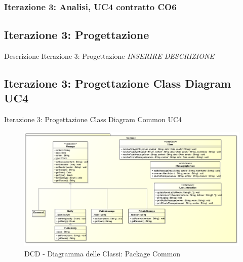 \begin{frame}
 \frametitle{Iterazione 3: Analisi, UC4 contratto CO6 }
  \begin{table}[!htbp]
   \caption {UC3 Contratto CO6 - privateMsg}
    \label{table_CO6}
   \end{table}
\end{frame}

\subsection{Iterazione 3: Progettazione}
\begin{frame} {Descrizione Iterazione 3: Progettazione}
  \emph{INSERIRE DESCRIZIONE}
\end{frame}

\subsection{Iterazione 3: Progettazione Class Diagram UC4}
\begin{frame} {Iterazione 3: Progettazione Class Diagram Common UC4}
   \begin{figure}
     \includegraphics[scale=0.15]{image_astah/Iteration_3_DesignModel/ClassDiagramCommon.png}{\centering}
     \caption{DCD - Diagramma delle Classi: Package Common }
     \label{fig_UC4_DCD_1} 
   \end{figure}
\end{frame}

